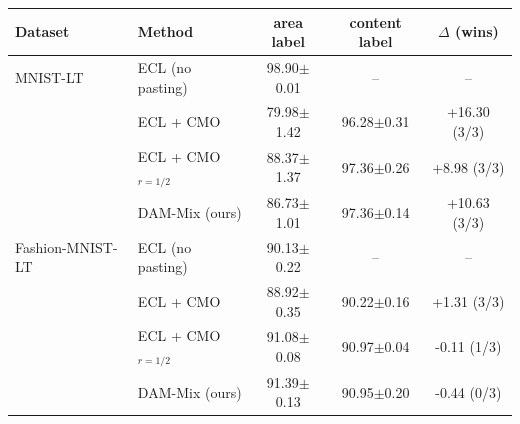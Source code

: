 \begin{tabular}{ll ccc}
\toprule
Dataset & Method & area label & content label & $\Delta$ (wins) \\
\midrule
MNIST-LT & ECL (no pasting) & 98.90{\scriptsize$\pm$0.01} & -- & -- \\
 & ECL + CMO & 79.98{\scriptsize$\pm$1.42} & 96.28{\scriptsize$\pm$0.31} & +16.30 (3/3) \\
 & ECL + CMO$_{r=1/2}$ & 88.37{\scriptsize$\pm$1.37} & 97.36{\scriptsize$\pm$0.26} & +8.98 (3/3) \\
 & DAM-Mix (ours) & 86.73{\scriptsize$\pm$1.01} & 97.36{\scriptsize$\pm$0.14} & +10.63 (3/3) \\
\midrule
Fashion-MNIST-LT & ECL (no pasting) & 90.13{\scriptsize$\pm$0.22} & -- & -- \\
 & ECL + CMO & 88.92{\scriptsize$\pm$0.35} & 90.22{\scriptsize$\pm$0.16} & +1.31 (3/3) \\
 & ECL + CMO$_{r=1/2}$ & 91.08{\scriptsize$\pm$0.08} & 90.97{\scriptsize$\pm$0.04} & -0.11 (1/3) \\
 & DAM-Mix (ours) & 91.39{\scriptsize$\pm$0.13} & 90.95{\scriptsize$\pm$0.20} & -0.44 (0/3) \\
\bottomrule
\end{tabular}
